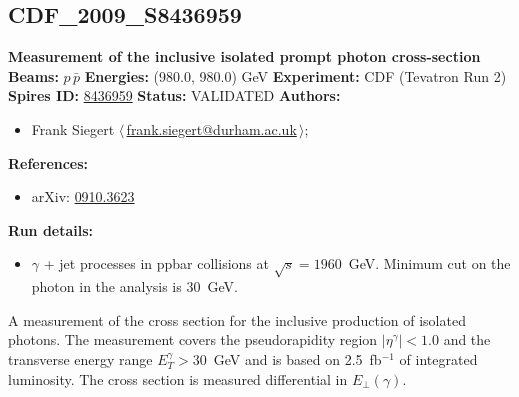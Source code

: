 \subsection[CDF\_2009\_S8436959]{CDF\_2009\_S8436959\,\cite{Aaltonen:2009ty}}
\textbf{Measurement of the inclusive isolated prompt photon cross-section}\newline
\textbf{Beams:} $p$\,$\bar{p}$ \newline
\textbf{Energies:} (980.0, 980.0) GeV \newline
\textbf{Experiment:} CDF (Tevatron Run 2) \newline
\textbf{Spires ID:} \href{http://www.slac.stanford.edu/spires/find/hep/www?rawcmd=key+8436959}{8436959}\newline
\textbf{Status:} VALIDATED\newline
\textbf{Authors:}
\begin{itemize}
  \item Frank Siegert $\langle\,$\href{mailto:frank.siegert@durham.ac.uk}{frank.siegert@durham.ac.uk}$\,\rangle$;
\end{itemize}
\textbf{References:}
\begin{itemize}
  \item arXiv: \href{http://arxiv.org/abs/0910.3623}{0910.3623}
\end{itemize}
\textbf{Run details:}
\begin{itemize}

  \item $\gamma$ + jet processes in ppbar collisions at $\sqrt{s} = 1960$~GeV. Minimum \pT cut on the photon in the analysis is 30~GeV.\end{itemize}

\noindent A measurement of the cross section for the inclusive production of isolated photons. The measurement covers the pseudorapidity region $|\eta^\gamma|<1.0$ and the transverse energy range $E_T^\gamma>30$~GeV and is based on 2.5~fb$^{-1}$ of integrated luminosity. The cross section is measured differential in $E_\perp(\gamma)$.

\clearpage


\clearpage


